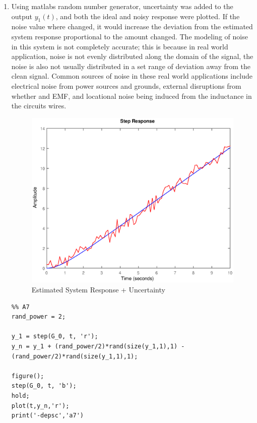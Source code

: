 \documentclass[11pt,a4paper]{article}
\begin{document}
\begin{enumerate}
    
    \pagebreak
    \item Using matlabs random number generator, uncertainty was added to the output $y_1(t)$, and both the ideal and noisy response were plotted. If the noise value where changed, it would increase the deviation from the estimated system response proportional to the amount changed. The modeling of noise in this system is not completely accurate; this is because in real world application, noise is not evenly distributed along the domain of the signal, the noise is also not usually distributed in a set range of deviation away from the clean signal. Common sources of noise in these real world applications include electrical noise from power sources and grounds, external disruptions from whether and EMF, and locational noise being induced from the inductance in the circuits wires.  
    \begin{figure}[H]
	\centering
	\includegraphics[width=.8\textwidth]{PreLach/a7.eps}
	\caption{\label{fig:rand}Estimated System Response + Uncertainty}
	\end{figure}
    \begin{lstlisting}
%% A7
rand_power = 2;

y_1 = step(G_0, t, 'r');
y_n = y_1 + (rand_power/2)*rand(size(y_1,1),1) - (rand_power/2)*rand(size(y_1,1),1);

figure();
step(G_0, t, 'b');
hold;
plot(t,y_n,'r');
print('-depsc','a7')

	\end{lstlisting}
    
\end{enumerate}
\end{document}
